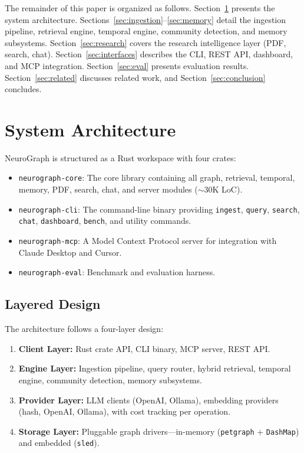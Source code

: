 \documentclass[11pt,twocolumn]{article}
\begin{document}
The remainder of this paper is organized as follows. Section~\ref{sec:arch} presents the system architecture. Sections~\ref{sec:ingestion}--\ref{sec:memory} detail the ingestion pipeline, retrieval engine, temporal engine, community detection, and memory subsystems. Section~\ref{sec:research} covers the research intelligence layer (PDF, search, chat). Section~\ref{sec:interfaces} describes the CLI, REST API, dashboard, and MCP integration. Section~\ref{sec:eval} presents evaluation results. Section~\ref{sec:related} discusses related work, and Section~\ref{sec:conclusion} concludes.

\section{System Architecture}
\label{sec:arch}

NeuroGraph is structured as a Rust workspace with four crates:

\begin{itemize}[nosep]
  \item \texttt{neurograph-core}: The core library containing all graph, retrieval, temporal, memory, PDF, search, chat, and server modules ($\sim$30K LoC).
  \item \texttt{neurograph-cli}: The command-line binary providing \texttt{ingest}, \texttt{query}, \texttt{search}, \texttt{chat}, \texttt{dashboard}, \texttt{bench}, and utility commands.
  \item \texttt{neurograph-mcp}: A Model Context Protocol server for integration with Claude Desktop and Cursor.
  \item \texttt{neurograph-eval}: Benchmark and evaluation harness.
\end{itemize}

\subsection{Layered Design}

The architecture follows a four-layer design:

\begin{enumerate}[nosep]
  \item \textbf{Client Layer:} Rust crate API, CLI binary, MCP server, REST API.
  \item \textbf{Engine Layer:} Ingestion pipeline, query router, hybrid retrieval, temporal engine, community detection, memory subsystems.
  \item \textbf{Provider Layer:} LLM clients (OpenAI, Ollama), embedding providers (hash, OpenAI, Ollama), with cost tracking per operation.
  \item \textbf{Storage Layer:} Pluggable graph drivers—in-memory (\texttt{petgraph} + \texttt{DashMap}) and embedded (\texttt{sled}).
\end{enumerate}
\end{document}
